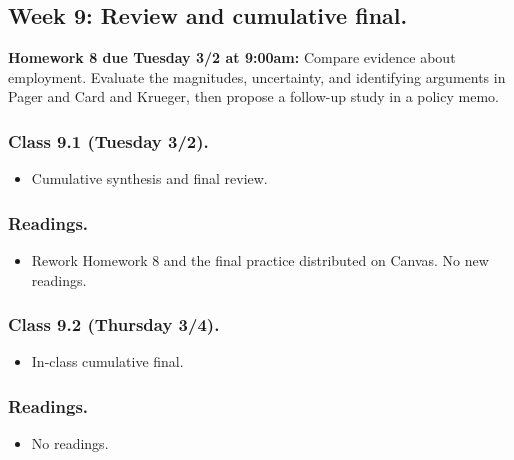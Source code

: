 \documentclass[letterpaper, 12pt, parskip=full,DIV=10]{scrartcl}
\begin{document}
\subsection*{Week 9: Review and cumulative final.}
\textbf{Homework 8 due Tuesday 3/2 at 9:00am:}
Compare evidence about employment. Evaluate the magnitudes, uncertainty, and identifying arguments in Pager and Card and Krueger, then propose a follow-up study in a policy memo.

\subsubsection*{Class 9.1 (Tuesday 3/2).}
\begin{itemize}
\item Cumulative synthesis and final review.
\end{itemize}

\subsubsection*{Readings.}
\begin{itemize}
\item Rework Homework 8 and the final practice distributed on Canvas. No new readings.
\end{itemize}

\subsubsection*{Class 9.2 (Thursday 3/4).}
\begin{itemize}
\item In-class cumulative final.
\end{itemize}

\subsubsection*{Readings.}
\begin{itemize}
\item No readings.
\end{itemize}
\end{document}
